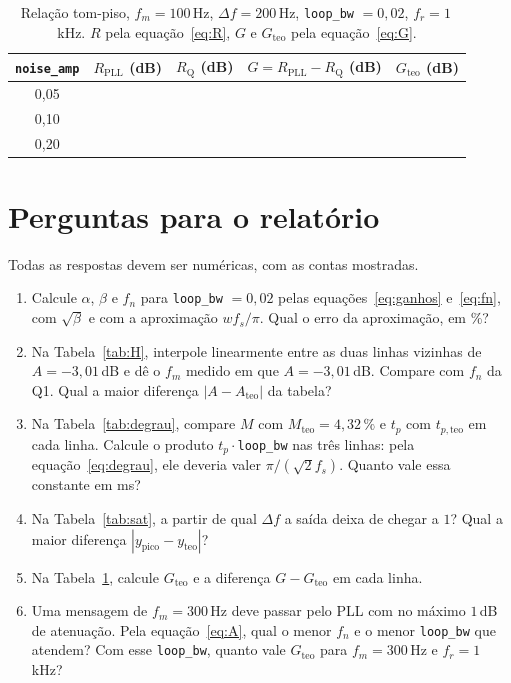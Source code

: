 \documentclass[11pt,a4paper]{article}
\begin{document}
\begin{table}[H]
  \centering
  \begin{tabular}{c c c c c}
    \toprule
    \texttt{noise\_amp} & $R_\text{PLL}$ (dB) & $R_\text{Q}$ (dB) & $G = R_\text{PLL} - R_\text{Q}$ (dB) & $G_\text{teo}$ (dB) \\
    \midrule
    0,05 & & & & \\
    0,10 & & & & \\
    0,20 & & & & \\
    \bottomrule
  \end{tabular}
  \caption{Relação tom-piso, $f_m = 100$\,Hz, $\Delta f = 200$\,Hz,
    \texttt{loop\_bw} $= 0{,}02$, $f_r = 1$\,kHz. $R$ pela
    equação~\eqref{eq:R}, $G$ e $G_\text{teo}$ pela equação~\eqref{eq:G}.}
  \label{tab:ruido}
\end{table}

\section{Perguntas para o relatório}

Todas as respostas devem ser numéricas, com as contas mostradas.

\begin{enumerate}[label=\textbf{Q\arabic*.}, leftmargin=*]

  \item Calcule $\alpha$, $\beta$ e $f_n$ para \texttt{loop\_bw} $= 0{,}02$
    pelas equações~\eqref{eq:ganhos} e~\eqref{eq:fn}, com $\sqrt\beta$ e com a
    aproximação $w f_s/\pi$. Qual o erro da aproximação, em \%?

  \item Na Tabela~\ref{tab:H}, interpole linearmente entre as duas linhas
    vizinhas de $A = -3{,}01$\,dB e dê o $f_m$ medido em que $A = -3{,}01$\,dB.
    Compare com $f_n$ da Q1. Qual a maior diferença $|A - A_\text{teo}|$ da
    tabela?

  \item Na Tabela~\ref{tab:degrau}, compare $M$ com $M_\text{teo} = 4{,}32\,\%$
    e $t_p$ com $t_{p,\text{teo}}$ em cada linha. Calcule o produto
    $t_p\cdot$\texttt{loop\_bw} nas três linhas: pela
    equação~\eqref{eq:degrau}, ele deveria valer $\pi/(\sqrt2 f_s)$. Quanto vale
    essa constante em ms?

  \item Na Tabela~\ref{tab:sat}, a partir de qual $\Delta f$ a saída deixa de
    chegar a $1$? Qual a maior diferença $|y_\text{pico} - y_\text{teo}|$?

  \item Na Tabela~\ref{tab:ruido}, calcule $G_\text{teo}$ e a diferença
    $G - G_\text{teo}$ em cada linha.

  \item Uma mensagem de $f_m = 300$\,Hz deve passar pelo PLL com no máximo
    $1$\,dB de atenuação. Pela equação~\eqref{eq:A}, qual o menor $f_n$ e o
    menor \texttt{loop\_bw} que atendem? Com esse \texttt{loop\_bw}, quanto
    vale $G_\text{teo}$ para $f_m = 300$\,Hz e $f_r = 1$\,kHz?

\end{enumerate}
\end{document}
